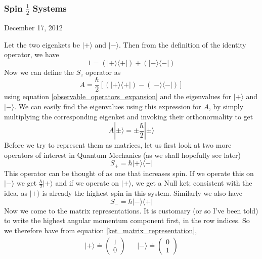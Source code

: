 \documentclass[12pt]{article}
\def\ket#1{|#1 \rangle}
\def\oupr#1#2{| #1 \rangle \langle #2 |}
\begin{document}
			\subsubsection{Spin $\frac 1 2$ Systems}
				\begin{flushright} December 17, 2012 \end{flushright}
				Let the two eigenkets be $\ket +$ and $\ket -$. Then from the definition of the identity operator, we have
				\begin{equation}
					1 = (\oupr + + ) + (\oupr - -)					
				\end{equation}
				Now we can define the $S_z$ operator as
				\begin{equation}
					A = \frac \hbar 2 \left[ (\oupr + + ) -  (\oupr --) \right]
					\label{operator_twostate}
				\end{equation}
				using equation \ref{observable_operators_expansion} and the eigenvalues for $\ket +$ and $\ket -$. We can easily find the eigenvalues using this expression for $A$, by simply multiplying the corresponding eigenket and invoking their orthonormality to get
				\begin{equation}
					A \ket \pm = \pm \frac \hbar 2 \ket \pm
				\end{equation}
				Before we try to represent them as matrices, let us first look at two more operators of interest in Quantum Mechanics (as we shall hopefully see later)
				\begin{equation}
					S_+ = \hbar \oupr + -
				\end{equation}
				This operator can be thought of as one that increases spin. If we operate this on $\ket -$ we get $\frac \hbar 2 \ket +$ and if we operate on $\ket +$, we get a Null ket; consistent with the idea, as $\ket +$ is already the highest spin in this system. Similarly we also have 
				\begin{equation}
					S_- = \hbar \oupr - +
				\end{equation}
				Now we come to the matrix representations. It is customary (or so I've been told) to write the highest angular momentum component first, in the row indices. So we therefore have from equation \ref{ket_matrix_representation},
				\begin{align}
				\ket + \doteq
				\left(
				\begin{array}{c}
					1 \\
					0
				\end{array}
				\right)
				& &\ket - \doteq
				\left(
				\begin{array}{c}
					0 \\
					1
				\end{array}
				\right)
				\end{align}
\end{document}
